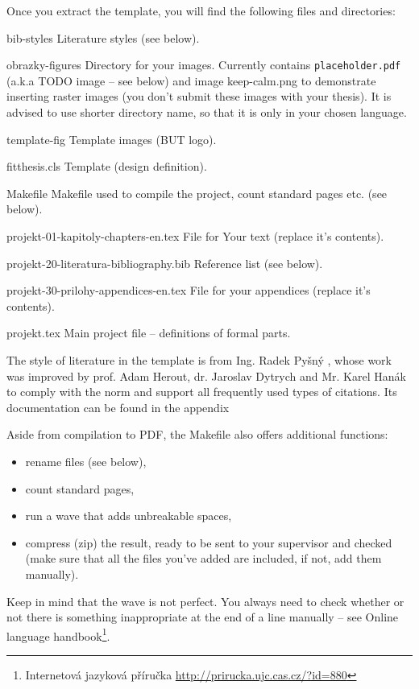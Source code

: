 Once you extract the template, you will find the following files and directories:
\begin{DESCRIPTION}
  \item [bib-styles] Literature styles (see below). 
  \item [obrazky-figures] Directory for your images. Currently contains \texttt{placeholder.pdf} (a.k.a TODO image -- see below) and image keep-calm.png to demonstrate inserting raster images (you don't submit these images with your thesis). It is advised to use shorter directory name, so that it is only in your chosen language.
  \item [template-fig] Template images (BUT logo).
  \item [fitthesis.cls] Template (design definition).
  \item [Makefile] Makefile used to compile the project, count standard pages etc. (see below).
  \item [projekt-01-kapitoly-chapters-en.tex] File for Your text (replace it's contents).
  \item [projekt-20-literatura-bibliography.bib] Reference list (see below).
  \item [projekt-30-prilohy-appendices-en.tex] File for your appendices (replace it's contents).
  \item [projekt.tex] Main project file -- definitions of formal parts.
\end{DESCRIPTION}

The style of literature in the template is from Ing. Radek Pyšný \cite{Pysny}, whose work was improved by prof. Adam Herout, dr. Jaroslav Dytrych and Mr. Karel Hanák to comply with the norm and support all frequently used types of citations. Its documentation can be found in the appendix

Aside from compilation to PDF, the Makefile also offers additional functions:
\begin{itemize}
  \item rename files (see below),
  \item count standard pages,
  \item run a wave that adds unbreakable spaces,
  \item compress (zip) the result, ready to be sent to your supervisor and checked (make sure that all the files you've added are included, if not, add them manually).
\end{itemize}

Keep in mind that the wave is not perfect. You always need to check whether or not there is something inappropriate at the end of a line manually -- see Online language handbook\footnote{Internetová jazyková příručka \url{http://prirucka.ujc.cas.cz/?id=880}}.

